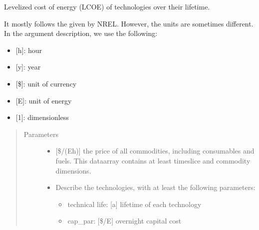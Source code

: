 \documentclass[letterpaper,10pt,english]{sphinxmanual}
\begin{document}
\begin{fulllineitems}
\label{\detokenize{api:muse.quantities.lifetime_levelized_cost_of_energy}}
Levelized cost of energy (LCOE) of technologies over their lifetime.

It mostly follows the  given by NREL. However, the units are
sometimes different. In the argument description, we use the following:
\begin{itemize}
\item {} 
{[}h{]}: hour

\item {} 
{[}y{]}: year

\item {} 
{[}\${]}: unit of currency

\item {} 
{[}E{]}: unit of energy

\item {} 
{[}1{]}: dimensionless

\end{itemize}
\begin{quote}\begin{description}
\item[{Parameters}] \leavevmode\begin{itemize}
\item {} 
 \textendash{} {[}\$/(Eh){]} the price of all commodities, including consumables and fuels.
This dataarray contains at least timeslice and commodity dimensions.

\item {} 
 \textendash{} 
Describe the technologies, with at least the following parameters:
\begin{itemize}
\item {} 
technical life: {[}a{]} lifetime of each technology

\item {} 
cap\_par: {[}\$/E{]} overnight capital cost


\end{itemize}
\end{itemize}
\end{description}
\end{quote}
\end{fulllineitems}
\end{document}
